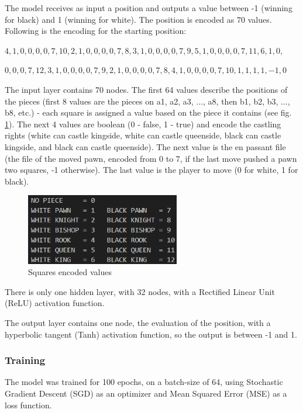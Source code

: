 The model receives as input a position and outputs a value between -1 (winning for black) and 1 (winning for white). The position is encoded as 70 values. Following is the encoding for the starting position:

$4,1,0,0,0,0,7,10,2,1,0,0,0,0,7,8,3,1,0,0,0,0,7,9,5,1,0,0,0,0,7,11,6,1,0,$

$0,0,0,7,12,3,1,0,0,0,0,7,9,2,1,0,0,0,0,7,8,4,1,0,0,0,0,7,10,1,1,1,1,-1,0$

The input layer contains 70 nodes. The first 64 values describe the positions of the pieces (first 8 values are the pieces on a1, a2, a3, ..., a8, then b1, b2, b3, ..., b8, etc.) - each square is assigned a value based on the piece it contains (see fig. \ref{fig:squaresEncodedValues}). The next 4 values are boolean (0 - false, 1 - true) and encode the castling rights (white can castle kingside, white can castle queenside, black can castle kingside, and black can castle queenside). The next value is the en passant file (the file of the moved pawn, encoded from 0 to 7, if the last move pushed a pawn two squares, -1 otherwise). The last value is the player to move (0 for white, 1 for black).

\begin{figure}[h]
    \centering
    \includegraphics[width=0.6\textwidth]{figures/squares-encoded-values.png}
    \caption{Squares encoded values}
    \label{fig:squaresEncodedValues}
\end{figure}

There is only one hidden layer, with 32 nodes, with a Rectified Linear Unit (ReLU) activation function.

The output layer contains one node, the evaluation of the position, with a hyperbolic tangent (Tanh) activation function, so the output is between -1 and 1.

\subsubsection{Training}
\label{subsec:ch4sec3subsec2subsubsec3}


The model was trained for 100 epochs, on a batch-size of 64, using Stochastic Gradient Descent (SGD) as an optimizer and Mean Squared Error (MSE) as a loss function.